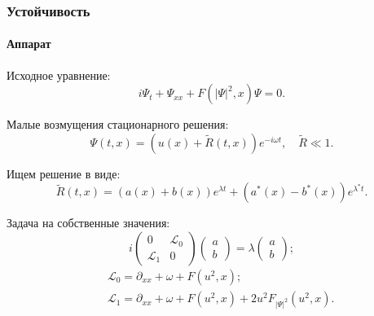 \documentclass [10pt] {beamer}
\begin{document}
\begin{frame}
	\frametitle{Устойчивость}
	\framesubtitle{Аппарат\footnotemark[4]}
	
	Исходное уравнение:
	\begin{equation}
		i \Psi_t + \Psi_{xx} + F(|\Psi|^2, x) \Psi = 0.
		\label{eq:stability}
	\end{equation}

	Малые возмущения стационарного решения:
	\begin{equation}
		\Psi(t, x) = (u(x) + \widetilde{R}(t, x)) e^{-i \omega t}, \quad \widetilde{R} \ll 1.
		\label{eq:perturbation}
	\end{equation}
	
	Ищем решение в виде:
	\begin{equation}
		\widetilde{R}(t, x) = (a(x) + b(x)) e^{\lambda t} + (a^*(x) - b^*(x)) e^{\lambda^* t}.
		\label{eq:ansatz}
	\end{equation}
	
	Задача на собственные значения:
	\begin{equation}
		i \begin{pmatrix} 0 & \mathcal{L}_0 \\ \mathcal{L}_1 & 0 \end{pmatrix} \begin{pmatrix} a \\ b \end{pmatrix} = \lambda \begin{pmatrix} a \\ b \end{pmatrix};
		\label{eq:eigenvalues}
	\end{equation}
	\begin{eqnarray}
		&& \mathcal{L}_0 = \partial_{xx} + \omega + F(u^2, x); \\
		&& \mathcal{L}_1 = \partial_{xx} + \omega + F(u^2, x) + 2u^2 F_{|\Psi|^2}(u^2, x).
	\end{eqnarray}
	
\end{frame}
\end{document}
